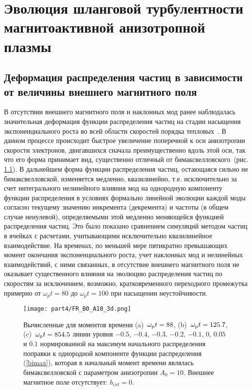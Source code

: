 \chapter{Эволюция шланговой турбулентности магнитоактивной анизотропной плазмы 
}\label{ch:ch4}

\section{Деформация распределения частиц в зависимости от величины  внешнего магнитного поля}
\label{part_evol_distr_func}
В отсутствии внешнего магнитного поля и наклонных мод ранее наблюдалась значительная деформация функции распределения частиц на стадии насыщения экспоненциального роста во всей области скоростей порядка тепловых~\cite{Kuznetsov2023}. В данном процессе происходит быстрое увеличение поперечной к оси анизотропии скорости электронов, двигавшихся сначала преимущественно вдоль этой оси, так что его форма принимает вид, существенно отличный от бимаксвелловского~(рис. \ref{ris:FR_A10_3d_B0}). В дальнейшем форма функции распределения частиц, остающаяся сильно не бимаксвелловской, изменяется медленно, квазилинейно, т.е. исключительно за счет интегрального нелинейного влияния мод на однородную компоненту функции распределения в условиях формально линейной эволюции каждой моды согласно текущему значению инкремента (декремента) и частоты (в общем случае ненулевой), определяемыми этой медленно меняющейся функцией распределения частиц. Это было показано сравнением симуляций методом частиц в ячейках с расчетами, учитывающими исключительно квазилинейное взаимодействие. На временах, по меньшей мере пятикратно превышающих момент окончания экспоненциального роста, учет наклонных мод и нелинейных взаимодействий, с ними связанных, в отсутствие внешнего магнитного поля не оказывает существенного влияния на эволюцию распределения частиц по скоростям за исключением, возможно, кратковременного переходного промежутка примерно от $\omega_pt=80$ до $\omega_pt=100$ при насыщении неустойчивости. 


\begin{figure}[h!]
\texttt{[image: part4/FR\_B0\_A10\_3d.png]}
\caption{Вычисленные для моментов времени (a)~$\omega_\mathrm{p} t = 88$, (b)~$\omega_\mathrm{p} t = 125.7$, (c)~$\omega_\mathrm{p} t = 854.5$ линии уровня $-0.5$, $-0.4$, $-0.3$, $-0.2$, $-0.1$, $0$, $0.05$ и $0.1$ нормированной на максимум начального распределения поправки к однородной компоненте функции распределения (\ref{bimax}), которая в начальный момент времени являлась бимаксвелловской с параметром анизотропии $A_0=10$. Внешнее магнитное поле отсутствует: $b_{ext}=0$.}
\label{ris:FR_A10_3d_B0}
\end{figure}


